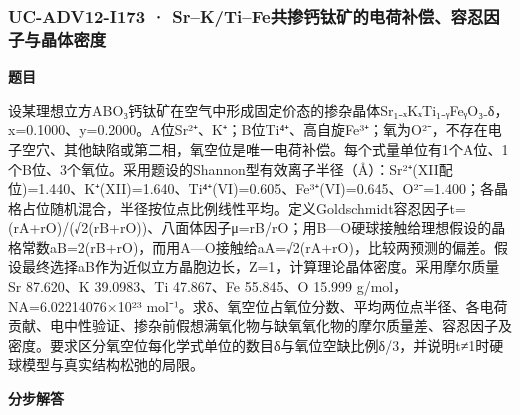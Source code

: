 \documentclass[UTF8,11pt,a4paper]{ctexart}
\begin{document}
\subsubsection*{UC-ADV12-I173 · Sr–K/Ti–Fe共掺钙钛矿的电荷补偿、容忍因子与晶体密度}
\noindent\textbf{题目}\par
设某理想立方ABO₃钙钛矿在空气中形成固定价态的掺杂晶体Sr₁₋ₓKₓTi₁₋ᵧFeᵧO₃₋δ，x=0.1000、y=0.2000。A位Sr²⁺、K⁺；B位Ti⁴⁺、高自旋Fe³⁺；氧为O²⁻，不存在电子空穴、其他缺陷或第二相，氧空位是唯一电荷补偿。每个式量单位有1个A位、1个B位、3个氧位。采用题设的Shannon型有效离子半径（Å）：Sr²⁺(XII配位)=1.440、K⁺(XII)=1.640、Ti⁴⁺(VI)=0.605、Fe³⁺(VI)=0.645、O²⁻=1.400；各晶格占位随机混合，半径按位点比例线性平均。定义Goldschmidt容忍因子t=(rA+rO)/(√2(rB+rO))、八面体因子μ=rB/rO；用B—O硬球接触给理想假设的晶格常数aB=2(rB+rO)，而用A—O接触给aA=√2(rA+rO)，比较两预测的偏差。假设最终选择aB作为近似立方晶胞边长，Z=1，计算理论晶体密度。采用摩尔质量Sr 87.620、K 39.0983、Ti 47.867、Fe 55.845、O 15.999 g/mol，NA=6.02214076×10²³ mol⁻¹。求δ、氧空位占氧位分数、平均两位点半径、各电荷贡献、电中性验证、掺杂前假想满氧化物与缺氧氧化物的摩尔质量差、容忍因子及密度。要求区分氧空位每化学式单位的数目δ与氧位空缺比例δ/3，并说明t≠1时硬球模型与真实结构松弛的局限。\par
\medskip\noindent\textbf{分步解答}
\end{document}
